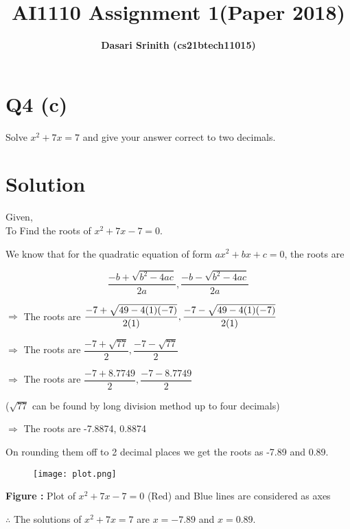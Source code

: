 \documentclass[11pt]{article}
\title{\textbf{AI1110 Assignment 1(Paper 2018)}}
\author{\textbf{Dasari Srinith (cs21btech11015)}}
\date{}
\begin{document}
\maketitle

\begin{multicols}{2}
\section*{Q4 (c)}
    Solve $x^2 + 7x = 7$ and give your answer correct to two decimals.
\vspace{-0.5cm}
\section*{Solution}

    Given,\\
    To Find the roots of $x^2 +7x -7 = 0$.
    
    We know that for the quadratic equation of form $ax^2 + bx +c = 0$,
    the roots are
    
    $$\dfrac{-b+\sqrt{b^2 -4ac}}{2a},\dfrac{-b-\sqrt{b^2 -4ac}}{2a}$$
    
    $\Rightarrow$ The roots are $\dfrac{-7+\sqrt{49 -4(1)(-7)}}{2(1)}
                       ,\\\dfrac{-7-\sqrt{49 -4(1)(-7)}}{2(1)}$
                       
    $\Rightarrow$ The roots are $\dfrac{-7+\sqrt{77}}{2}
                       ,\dfrac{-7-\sqrt{77}}{2}$
                       
    $\Rightarrow$ The roots are $\dfrac{-7+8.7749}{2}
                       ,\dfrac{-7-8.7749}{2}$
                       
    ($\sqrt{77}$ can be found by long division method up to four decimals)
    
    $\Rightarrow$ The roots are -7.8874, 0.8874
    
    On rounding them off to 2 decimal places we get the roots as -7.89 and 0.89.
    
    \begin{figure}[H]
        \texttt{[image: plot.png]}
    \end{figure}
    \begin{center}
        \textbf{Figure :} Plot of $x^2 + 7x - 7 =0 $ (Red) and Blue lines are considered as axes
    \end{center}
    $\therefore$ The solutions of $x^2 + 7x = 7$ are  $x = -7.89$ and $x = 0.89$.
    

\end{multicols}
\end{document}
